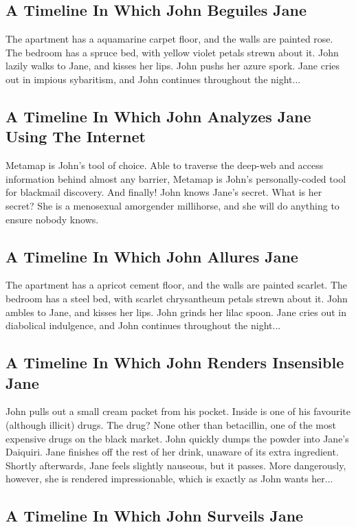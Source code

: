 \documentclass{article}
\begin{document}
\subsection{A Timeline In Which John Beguiles Jane}


The apartment has a aquamarine carpet floor, and the walls are painted rose.
The bedroom has a spruce bed, with yellow violet petals strewn about it.
John lazily walks to Jane, and kisses her lips.
John pushs her azure spork.
Jane cries out in impious sybaritism, and John continues throughout the night...
\subsection{A Timeline In Which John Analyzes Jane Using The Internet}


Metamap is John's tool of choice. Able to traverse the deep{-}web and access information behind almost any barrier, Metamap is John's personally{-}coded tool for blackmail discovery.
And finally!
John knows Jane's secret. What is her secret? She is a menosexual amorgender millihorse, and she will do anything to ensure nobody knows.
\subsection{A Timeline In Which John Allures Jane}


The apartment has a apricot cement floor, and the walls are painted scarlet.
The bedroom has a steel bed, with scarlet chrysantheum petals strewn about it.
John ambles to Jane, and kisses her lips.
John grinds her lilac spoon.
Jane cries out in diabolical indulgence, and John continues throughout the night...
\subsection{A Timeline In Which John Renders Insensible Jane}


John pulls out a small cream packet from his pocket. Inside is one of his favourite (although illicit) drugs.
The drug? None other than betacillin, one of the most expensive drugs on the black market.
John quickly dumps the powder into Jane's Daiquiri.
Jane finishes off the rest of her drink, unaware of its extra ingredient.
Shortly afterwards, Jane feels slightly nauseous, but it passes.
More dangerously, however, she is rendered impressionable, which is exactly as John wants her...
\subsection{A Timeline In Which John Surveils Jane}
\end{document}
